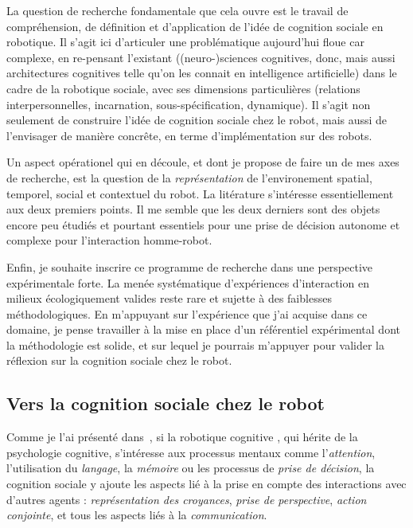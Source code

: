 \documentclass[a4paper]{article}
\begin{document}
La question de recherche fondamentale que cela ouvre est le travail de
compréhension, de définition et d'application de l'idée de cognition sociale en
robotique. Il s'agit ici d'articuler une problématique aujourd'hui floue car
complexe, en re-pensant l'existant ((neuro-)sciences cognitives, donc, mais
aussi architectures cognitives telle qu'on les connait en intelligence
artificielle) dans le cadre de la robotique sociale, avec ses dimensions
particulières (relations interpersonnelles, incarnation, sous-spécification,
dynamique). Il s'agit non seulement de construire l'idée de cognition sociale
chez le robot, mais aussi de l'envisager de manière concrête, en terme
d'implémentation sur des robots.

Un aspect opérationel qui en découle, et dont je propose de faire un de mes axes
de recherche, est la question de la \emph{représentation} de l'environement
spatial, temporel, social et contextuel du robot. La litérature s'intéresse
essentiellement aux deux premiers points. Il me semble que les deux derniers
sont des objets encore peu étudiés et pourtant essentiels pour une prise de
décision autonome et complexe pour l'interaction homme-robot.

Enfin, je souhaite inscrire ce programme de recherche dans une perspective
expérimentale forte. La menée systématique d'expériences d'interaction en milieux
écologiquement valides reste rare et sujette à des faiblesses méthodologiques.
En m'appuyant sur l'expérience que j'ai acquise dans ce domaine, je pense
travailler à la mise en place d'un référentiel expérimental dont la méthodologie
est solide, et sur lequel je pourrais m'appuyer pour valider la réflexion sur la
cognition sociale chez le robot.

\subsection{Vers la cognition sociale chez le robot}

Comme je l'ai présenté dans~\cite{lemaignan2014human}, si la robotique cognitive
, qui hérite de la psychologie cognitive, s'intéresse aux processus mentaux
comme l'\emph{attention}, l'utilisation du \emph{langage}, la \emph{mémoire} ou
les processus de \emph{prise de décision}, la cognition sociale y ajoute les
aspects lié à la prise en compte des interactions avec d'autres agents :
\emph{représentation des croyances}, \emph{prise de perspective}, \emph{action
conjointe}, et tous les aspects liés à la \emph{communication}.
\end{document}
